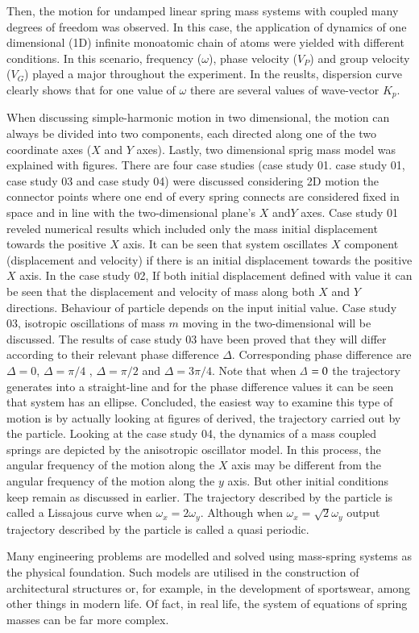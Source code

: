 Then, the motion for undamped linear spring mass systems with coupled many degrees of freedom was observed. In this case, the application of dynamics of one dimensional (1D) infinite monoatomic chain of atoms were  yielded with different conditions. In this scenario, frequency ($\omega$), phase velocity ($V_P$) and group velocity ($V_G$) played a major throughout the experiment. In the reuslts, dispersion curve clearly shows that for one value of $\omega$ there are several values of wave-vector $K_p$.  

When discussing simple-harmonic motion in two dimensional, the motion can always be divided into two components, each directed along one of the two coordinate axes ($X$ and $Y$ axes). Lastly, two dimensional sprig mass model was explained with figures. There are four case studies (case study 01. case study 01, case study 03 and case study 04) were discussed considering 2D motion the connector points where one end of every spring connects are considered fixed in space and in line with the two-dimensional plane’s $X$ and$Y$ axes. Case study 01 reveled numerical results which included only the mass initial displacement towards the positive $X$ axis. It can be seen that system oscillates $X$ component (displacement and velocity) if there is an initial displacement towards the positive $X$ axis. In the case study 02, If both initial displacement defined with value it can be seen that the displacement and velocity of mass along both $X$ and $Y$ directions. Behaviour of particle depends on the input initial value. Case study 03, isotropic oscillations of mass $m$ moving in the two-dimensional will be discussed. The results of case study 03 have been proved  that they will differ according to their relevant phase difference $\Delta$. Corresponding phase difference are  $\Delta = 0 $, $\Delta = \pi/4 $ , $\Delta = \pi/2 $ and $\Delta = 3\pi/4 $. Note that when ${\mit\Delta}=0$ the trajectory generates into a straight-line  and for the phase difference values it can be seen that system has an ellipse. Concluded, the easiest way to examine this type of motion is by actually looking at figures of derived, the trajectory carried out by the particle. Looking at the case study 04, the dynamics of a mass coupled springs are depicted by the anisotropic oscillator model. In this process, the angular frequency of the motion along the $X$ axis may be different from the angular frequency of the motion along the $y$ axis.  But other initial conditions keep remain as discussed in earlier. The trajectory described by the particle is called a Lissajous curve when $\omega_x = 2\omega_y$. Although when $\omega_x = \sqrt{2}\omega_y$ output trajectory described by the particle is called a quasi periodic. 

Many engineering problems are modelled and solved using mass-spring systems as the physical foundation. Such models are utilised in the construction of architectural structures or, for example, in the development of sportswear, among other things in modern life. Of fact, in real life, the system of equations of spring masses can be far more complex.
